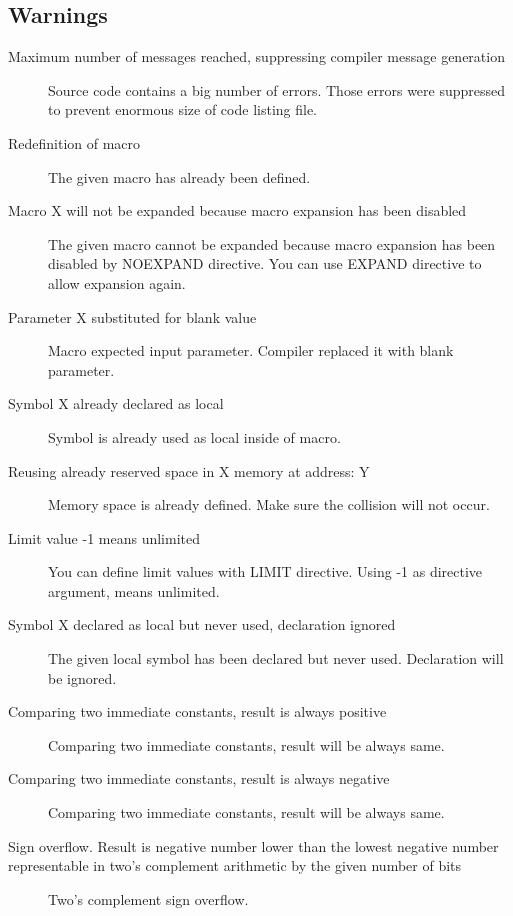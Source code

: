     \subsection{Warnings}
        \begin{description}
            \item[Maximum number of messages reached, suppressing compiler message generation]
                Source code contains a big number of errors. Those errors were suppressed to prevent enormous size of code listing file.
            \item[Redefinition of macro ]
                The given macro has already been defined.
            \item[Macro X will not be expanded because macro expansion has been disabled]
                The given macro cannot be expanded because macro expansion has been disabled by NOEXPAND directive. You can use EXPAND directive to allow expansion again.
            \item[Parameter X substituted for blank value ]
                Macro expected input parameter. Compiler replaced it with blank parameter.
            \item[Symbol X already declared as local ]
                Symbol is already used as local inside of macro.
            \item[Reusing already reserved space in X memory at address: Y]
                Memory space is already defined. Make sure the collision will not occur.
            \item[Limit value -1 means unlimited]
                You can define limit values with LIMIT directive. Using -1 as directive argument, means unlimited.
            \item[Symbol X declared as local but never used, declaration ignored]
                The given local symbol has been declared but never used. Declaration will be ignored.
            \item[Comparing two immediate constants, result is always positive]
                Comparing two immediate constants, result will be always same.
            \item[Comparing two immediate constants, result is always negative]
                Comparing two immediate constants, result will be always same.
            \item[Sign overflow. Result is negative number lower than the lowest negative number representable in two's         complement arithmetic by the given number of bits ]
                Two's complement sign overflow.

\end{description}
